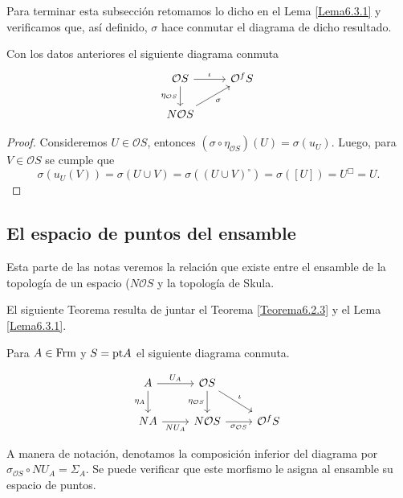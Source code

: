 Para terminar esta subsección retomamos lo dicho en el Lema \ref{Lema6.3.1} y verificamos que, así definido, $\sigma$ hace conmutar el diagrama de dicho resultado.

\begin{lem}\label{Lema6.3.6}
    Con los datos anteriores el siguiente diagrama conmuta
    \[\begin{tikzcd}
	{\mathcal{O}S} & {\mathcal{O} ^fS} \\
	{N\mathcal{O}S}
	\arrow["\iota", from=1-1, to=1-2]
	\arrow["{\eta_{\mathcal{O}S}}"', from=1-1, to=2-1]
	\arrow["\sigma"', from=2-1, to=1-2]
\end{tikzcd}\]
\end{lem}

\begin{proof}
    Consideremos $U\in \mathcal{O}S$, entonces $(\sigma\circ \eta_{\mathcal{O}S})(U)=\sigma(u_U)$. Luego, para $V\in \mathcal{O}S$ se cumple que 
    \[
    \sigma(u_U(V))=\sigma(U\cup V)=\sigma((U\cup V)^\circ)=\sigma([U])=U^\Box=U.
    \]
\end{proof}

\subsection{El espacio de puntos del ensamble}

Esta parte de las notas veremos la relación que existe entre el ensamble de la topología de un espacio ($N\mathcal{O}S$ y la topología de Skula. 

El siguiente Teorema resulta de juntar el Teorema \ref{Teorema6.2.3} y el Lema \ref{Lema6.3.1}.

\begin{thm}\label{Teorema6.4.1}
    Para $A\in \mathrm{Frm}$ y $S=\mathrm{pt} A$ el siguiente diagrama conmuta.

    \[\begin{tikzcd}
	A & {\mathcal{O}S} \\
	NA & {N\mathcal{O}S} & {\mathcal{O}^fS}
	\arrow["{U_A}", from=1-1, to=1-2]
	\arrow["{\eta_A}"', from=1-1, to=2-1]
	\arrow["{\eta_{\mathcal{O}S}}"', from=1-2, to=2-2]
	\arrow["\iota", from=1-2, to=2-3]
	\arrow["{NU_A}"', from=2-1, to=2-2]
	\arrow["{\sigma_{\mathcal{O}S}}"', from=2-2, to=2-3]
\end{tikzcd}\]
\end{thm}

A manera de notación, denotamos la composición inferior del diagrama por $\sigma_{\mathcal{O}S}\circ NU_A=\Sigma_A$. Se puede verificar que este morfismo le asigna al ensamble su espacio de puntos.

